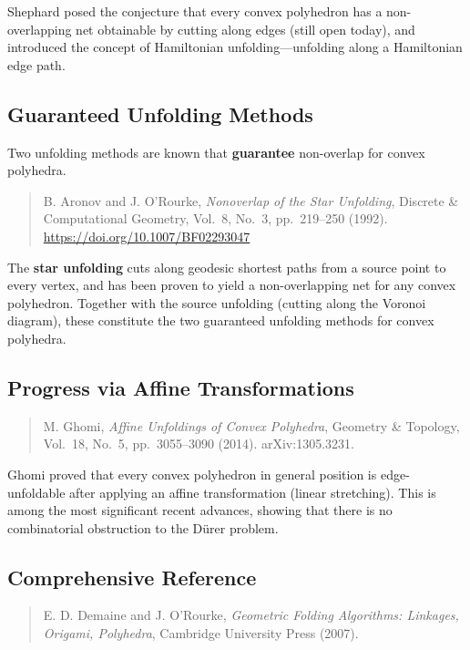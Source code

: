 \documentclass[a4paper,11pt]{article}
\begin{document}
Shephard posed the conjecture that every convex polyhedron has a non-overlapping net
obtainable by cutting along edges (still open today),
and introduced the concept of Hamiltonian unfolding---unfolding along a Hamiltonian edge path.

\subsection{Guaranteed Unfolding Methods}

Two unfolding methods are known that \textbf{guarantee} non-overlap for convex polyhedra.

\begin{quotation}\noindent
  B. Aronov and J. O'Rourke,
  \textit{Nonoverlap of the Star Unfolding},
  Discrete \& Computational Geometry, Vol.~8, No.~3, pp.~219--250 (1992).
  \url{https://doi.org/10.1007/BF02293047}
\end{quotation}

The \textbf{star unfolding} cuts along geodesic shortest paths from a source point to every
vertex, and has been proven to yield a non-overlapping net for any convex polyhedron.
Together with the source unfolding (cutting along the Voronoi diagram), these constitute
the two guaranteed unfolding methods for convex polyhedra.

\subsection{Progress via Affine Transformations}

\begin{quotation}\noindent
  M. Ghomi,
  \textit{Affine Unfoldings of Convex Polyhedra},
  Geometry \& Topology, Vol.~18, No.~5, pp.~3055--3090 (2014).
  arXiv:1305.3231.
\end{quotation}

Ghomi proved that every convex polyhedron in general position is edge-unfoldable after
applying an affine transformation (linear stretching).
This is among the most significant recent advances, showing that there is no combinatorial
obstruction to the D\"{u}rer problem.

\subsection{Comprehensive Reference}

\begin{quotation}\noindent
  E. D. Demaine and J. O'Rourke,
  \textit{Geometric Folding Algorithms: Linkages, Origami, Polyhedra},
  Cambridge University Press (2007).
\end{quotation}
\end{document}
